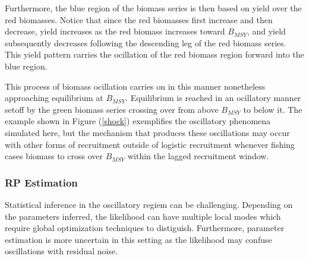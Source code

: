 %
Furthermore, the blue region of the biomass series is then based on yield 
over the red biomasses. Notice that since the red biomasses first increase and 
then decrease, yield increases as the red biomass increases toward 
$B_{MSY}$, and yield subsequently decreases following the descending leg 
of the red biomass series. %
This yield pattern carries the ocillation of the red biomass region 
forward into the blue region. 

%
This process of biomass ocillation carries on in this manner nonetheless 
approaching equilibrium at $B_{MSY}$. Equilibrium is reached in an ocillatory 
manner setoff by the green biomass series crossing over from above $B_{MSY}$ 
to below it. The example shown in Figure (\ref{shock}) exemplifies the oscillatory 
phenomena simulated here, but the mechanism that produces these oscillations may 
occur with other forms of recruitment outside of logistic recruitment whenever 
fishing cases biomass to cross over $B_{MSY}$ within the lagged recruitment window.  

%
\subsubsection{RP Estimation}

%
Statistical inference in the oscillatory regiem can be challenging. Depending on 
the parameters inferred, the likelihood can have multiple local modes which 
require global optimization techniques to distiguish. Furthermore, parameter 
estimation is more uncertain in this setting as the likelihood may confuse 
oscillations with residual noise. 

